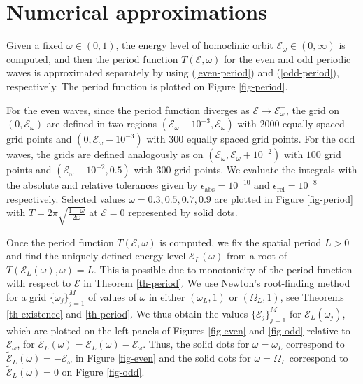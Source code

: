 \documentclass[12pt,reqno]{amsart}
\numberwithin{equation}{section}
\numberwithin{figure}{section}
\begin{document}
		 


\section{Numerical approximations}
\label{sec-6}


Given a fixed $\omega \in (0,1)$, the energy level of homoclinic orbit $\mathcal E_\omega \in (0,\infty)$ is computed, and then  the period function $T(\mathcal{E},\omega)$ for the even and odd periodic waves is approximated separately by using (\ref{even-period}) and (\ref{odd-period}), respectively. 
The period function is plotted on Figure \ref{fig-period}.

For the even waves, since the period function diverges as $\mathcal E \to \mathcal E_\omega^- $, the grid on $(0,\mathcal E_\omega)$ are defined in two regions $(\mathcal E_\omega-10^{-3},\mathcal E_\omega)$ with $2000$ equally spaced grid points and $(0, \mathcal E_\omega-10^{-3})$ with $300$ 
equally spaced grid points. For the odd waves, the grids are defined analogously as on $(\mathcal E_\omega, \mathcal E_\omega +10^{-2})$ with $100$ grid points and $( \mathcal E_\omega +10^{-2}, 0.5)$ with $300$ grid points. We evaluate the integrals with the absolute and relative tolerances given by  $\epsilon_\mathrm{abs}=10^{-10}$ and $\epsilon_\mathrm{rel}=10^{-8}$ respectively. Selected values $\omega =0.3,0.5,0.7,0.9$ are plotted in Figure \ref{fig-period} with $T = 2\pi \sqrt{\frac{1-\omega}{2\omega}}$ at $\mathcal{E}= 0$ represented by solid dots.

Once the period function $T(\mathcal{E},\omega)$ is computed, we fix the spatial 
period $L > 0$ and find the uniquely defined energy level $\mathcal{E}_L(\omega)$ from a root of $T(\mathcal{E}_L(\omega), \omega) = L$. This is possible due to monotonicity of the period function with respect to $\mathcal{E}$ in Theorem \ref{th-period}. We use Newton's root-finding method for a grid $\{\omega_j\}_{j=1}^{M}$ of values of $\omega$ in either $(\omega_L,1)$ or $(\Omega_L,1)$, see Theorems \ref{th-existence} and \ref{th-period}. We thus obtain the values $\{ \mathcal{E}_j \}_{j=1}^M$ for $\mathcal{E}_L(\omega_j)$, which are plotted on the left panels of Figures \ref{fig-even} and \ref{fig-odd} relative to $\mathcal{E}_{\omega}$, for $\tilde{\mathcal{E}}_L(\omega) = \mathcal{E}_L(\omega) - \mathcal{E}_{\omega}$. Thus, the solid dots for $\omega = \omega_L$ correspond to $\tilde{\mathcal{E}}_L(\omega) = - \mathcal{E}_{\omega}$ in Figure \ref{fig-even} 
and the solid dots for $\omega = \Omega_L$ correspond to $\tilde{\mathcal{E}}_L(\omega) = 0$ on Figure \ref{fig-odd}.
\end{document}

